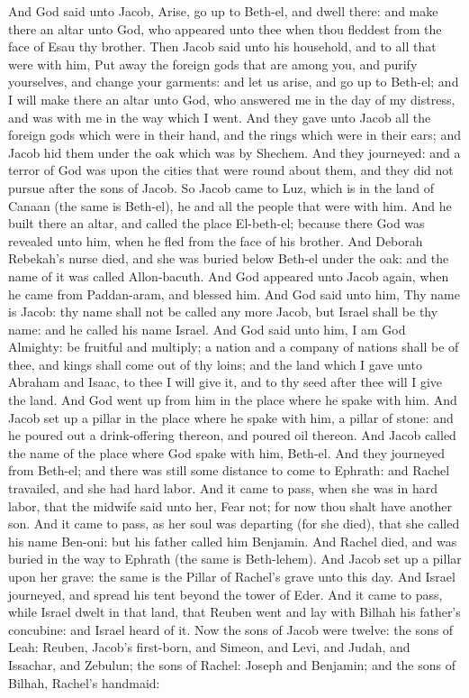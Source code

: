 And God said unto Jacob, Arise, go up to Beth-el, and dwell there: and make there an altar unto God, who appeared unto thee when thou fleddest from the face of Esau thy brother. Then Jacob said unto his household, and to all that were with him, Put away the foreign gods that are among you, and purify yourselves, and change your garments: and let us arise, and go up to Beth-el; and I will make there an altar unto God, who answered me in the day of my distress, and was with me in the way which I went. And they gave unto Jacob all the foreign gods which were in their hand, and the rings which were in their ears; and Jacob hid them under the oak which was by Shechem. And they journeyed: and a terror of God was upon the cities that were round about them, and they did not pursue after the sons of Jacob. So Jacob came to Luz, which is in the land of Canaan (the same is Beth-el), he and all the people that were with him. And he built there an altar, and called the place El-beth-el; because there God was revealed unto him, when he fled from the face of his brother. And Deborah Rebekah’s nurse died, and she was buried below Beth-el under the oak: and the name of it was called Allon-bacuth.  And God appeared unto Jacob again, when he came from Paddan-aram, and blessed him. And God said unto him, Thy name is Jacob: thy name shall not be called any more Jacob, but Israel shall be thy name: and he called his name Israel. And God said unto him, I am God Almighty: be fruitful and multiply; a nation and a company of nations shall be of thee, and kings shall come out of thy loins; and the land which I gave unto Abraham and Isaac, to thee I will give it, and to thy seed after thee will I give the land. And God went up from him in the place where he spake with him. And Jacob set up a pillar in the place where he spake with him, a pillar of stone: and he poured out a drink-offering thereon, and poured oil thereon. And Jacob called the name of the place where God spake with him, Beth-el.  And they journeyed from Beth-el; and there was still some distance to come to Ephrath: and Rachel travailed, and she had hard labor. And it came to pass, when she was in hard labor, that the midwife said unto her, Fear not; for now thou shalt have another son. And it came to pass, as her soul was departing (for she died), that she called his name Ben-oni: but his father called him Benjamin. And Rachel died, and was buried in the way to Ephrath (the same is Beth-lehem). And Jacob set up a pillar upon her grave: the same is the Pillar of Rachel’s grave unto this day. And Israel journeyed, and spread his tent beyond the tower of Eder. And it came to pass, while Israel dwelt in that land, that Reuben went and lay with Bilhah his father’s concubine: and Israel heard of it. Now the sons of Jacob were twelve: the sons of Leah: Reuben, Jacob’s first-born, and Simeon, and Levi, and Judah, and Issachar, and Zebulun; the sons of Rachel: Joseph and Benjamin; and the sons of Bilhah, Rachel’s handmaid: 